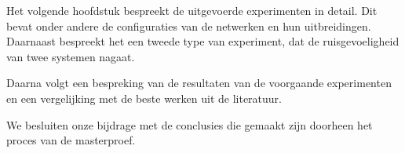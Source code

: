 Het volgende hoofdstuk bespreekt de uitgevoerde experimenten in detail. Dit bevat onder andere de configuraties van de netwerken en hun uitbreidingen. Daarnaast bespreekt het een tweede type van experiment, dat de ruisgevoeligheid van twee systemen nagaat.

Daarna volgt een bespreking van de resultaten van de voorgaande experimenten en een vergelijking met de beste werken uit de literatuur.

We besluiten onze bijdrage met de conclusies die gemaakt zijn doorheen het proces van de masterproef.
 
